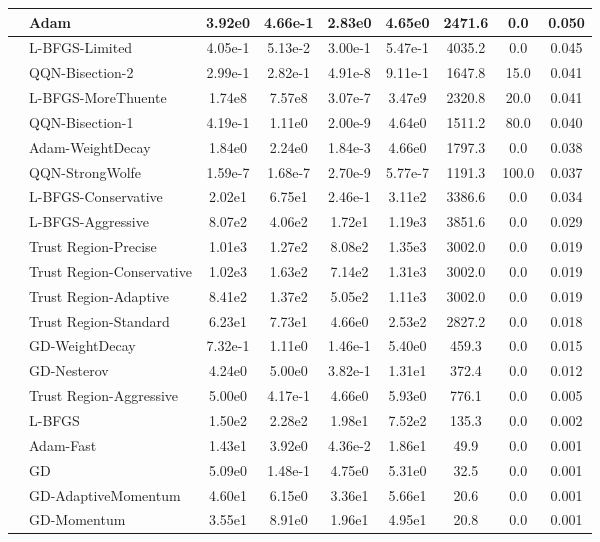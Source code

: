 \documentclass{article}
\begin{document}
\begin{longtable}{|l|l|c|c|c|c|c|c|c|}
\hline
 & Adam & 3.92e0 & 4.66e-1 & 2.83e0 & 4.65e0 & 2471.6 & 0.0 & 0.050 \\
\hline
 & L-BFGS-Limited & 4.05e-1 & 5.13e-2 & 3.00e-1 & 5.47e-1 & 4035.2 & 0.0 & 0.045 \\
\hline
 & QQN-Bisection-2 & 2.99e-1 & 2.82e-1 & 4.91e-8 & 9.11e-1 & 1647.8 & 15.0 & 0.041 \\
\hline
 & L-BFGS-MoreThuente & 1.74e8 & 7.57e8 & 3.07e-7 & 3.47e9 & 2320.8 & 20.0 & 0.041 \\
\hline
 & QQN-Bisection-1 & 4.19e-1 & 1.11e0 & 2.00e-9 & 4.64e0 & 1511.2 & 80.0 & 0.040 \\
\hline
 & Adam-WeightDecay & 1.84e0 & 2.24e0 & 1.84e-3 & 4.66e0 & 1797.3 & 0.0 & 0.038 \\
\hline
 & QQN-StrongWolfe & 1.59e-7 & 1.68e-7 & 2.70e-9 & 5.77e-7 & 1191.3 & 100.0 & 0.037 \\
\hline
 & L-BFGS-Conservative & 2.02e1 & 6.75e1 & 2.46e-1 & 3.11e2 & 3386.6 & 0.0 & 0.034 \\
\hline
 & L-BFGS-Aggressive & 8.07e2 & 4.06e2 & 1.72e1 & 1.19e3 & 3851.6 & 0.0 & 0.029 \\
\hline
 & Trust Region-Precise & 1.01e3 & 1.27e2 & 8.08e2 & 1.35e3 & 3002.0 & 0.0 & 0.019 \\
\hline
 & Trust Region-Conservative & 1.02e3 & 1.63e2 & 7.14e2 & 1.31e3 & 3002.0 & 0.0 & 0.019 \\
\hline
 & Trust Region-Adaptive & 8.41e2 & 1.37e2 & 5.05e2 & 1.11e3 & 3002.0 & 0.0 & 0.019 \\
\hline
 & Trust Region-Standard & 6.23e1 & 7.73e1 & 4.66e0 & 2.53e2 & 2827.2 & 0.0 & 0.018 \\
\hline
 & GD-WeightDecay & 7.32e-1 & 1.11e0 & 1.46e-1 & 5.40e0 & 459.3 & 0.0 & 0.015 \\
\hline
 & GD-Nesterov & 4.24e0 & 5.00e0 & 3.82e-1 & 1.31e1 & 372.4 & 0.0 & 0.012 \\
\hline
 & Trust Region-Aggressive & 5.00e0 & 4.17e-1 & 4.66e0 & 5.93e0 & 776.1 & 0.0 & 0.005 \\
\hline
 & L-BFGS & 1.50e2 & 2.28e2 & 1.98e1 & 7.52e2 & 135.3 & 0.0 & 0.002 \\
\hline
 & Adam-Fast & 1.43e1 & 3.92e0 & 4.36e-2 & 1.86e1 & 49.9 & 0.0 & 0.001 \\
\hline
 & GD & 5.09e0 & 1.48e-1 & 4.75e0 & 5.31e0 & 32.5 & 0.0 & 0.001 \\
\hline
 & GD-AdaptiveMomentum & 4.60e1 & 6.15e0 & 3.36e1 & 5.66e1 & 20.6 & 0.0 & 0.001 \\
\hline
 & GD-Momentum & 3.55e1 & 8.91e0 & 1.96e1 & 4.95e1 & 20.8 & 0.0 & 0.001 \\

\end{longtable}
\end{document}
